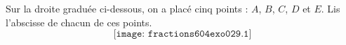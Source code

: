 Sur la droite graduée ci-dessous, on a placé cinq points : $A$, $B$,
$C$, $D$ et $E$. Lis l'abscisse de chacun de ces points.
\[\texttt{[image: fractions604exo029.1]}\]